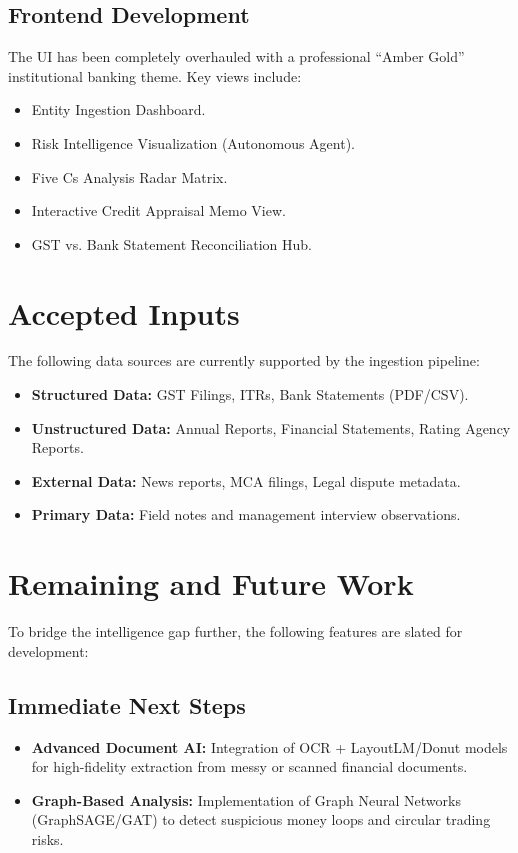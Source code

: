 \documentclass[11pt]{article}
\begin{document}
\subsection{Frontend Development}
The UI has been completely overhauled with a professional ``Amber Gold'' institutional banking theme. Key views include:
\begin{itemize}[noitemsep]
    \item Entity Ingestion Dashboard.
    \item Risk Intelligence Visualization (Autonomous Agent).
    \item Five Cs Analysis Radar Matrix.
    \item Interactive Credit Appraisal Memo View.
    \item GST vs. Bank Statement Reconciliation Hub.
\end{itemize}

\section{Accepted Inputs}
The following data sources are currently supported by the ingestion pipeline:
\begin{itemize}[noitemsep]
    \item \textbf{Structured Data:} GST Filings, ITRs, Bank Statements (PDF/CSV).
    \item \textbf{Unstructured Data:} Annual Reports, Financial Statements, Rating Agency Reports.
    \item \textbf{External Data:} News reports, MCA filings, Legal dispute metadata.
    \item \textbf{Primary Data:} Field notes and management interview observations.
\end{itemize}

\section{Remaining and Future Work}
To bridge the intelligence gap further, the following features are slated for development:

\subsection{Immediate Next Steps}
\begin{itemize}[noitemsep]
    \item \textbf{Advanced Document AI:} Integration of OCR + LayoutLM/Donut models for high-fidelity extraction from messy or scanned financial documents.
    \item \textbf{Graph-Based Analysis:} Implementation of Graph Neural Networks (GraphSAGE/GAT) to detect suspicious money loops and circular trading risks.
\end{itemize}
\end{document}
